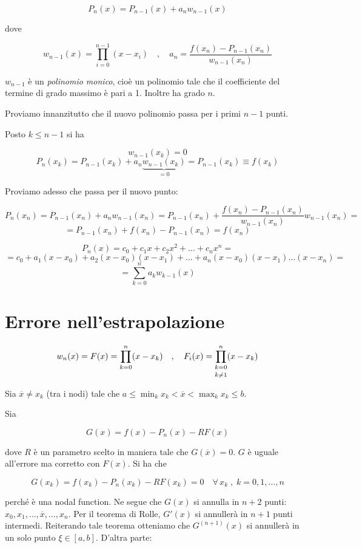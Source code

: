 $$P_n(x)=P_{n-1}(x) + a_n w_{n-1}(x)$$

dove

$$w_{n-1}(x)=\prod_{i=0}^{n-1} (x - x_i)
\quad,\quad
a_n=\frac{f(x_n) - P_{n-1}(x_n)}{w_{n-1}(x_n)}$$

$w_{n-1}$ è un \textit{polinomio monico}, cioè un polinomio tale che il coefficiente del termine di grado massimo è pari a 1. Inoltre ha grado $n$.

\vspace{0.2cm}Proviamo innanzitutto che il nuovo polinomio passa per i primi $n-1$ punti.

Posto $k \leq n-1$ si ha

$$w_{n-1}(x_k)=0$$
$$P_n(x_k)=P_{n-1}(x_k) + a_n \underbrace{w_{n-1}(x_k)}_{=0}
=P_{n-1}(x_k)
\equiv f(x_k)$$

Proviamo adesso che passa per il nuovo punto:

$$P_n(x_n)=P_{n-1}(x_n) + a_n w_{n-1}(x_n)
=P_{n-1}(x_n) + \frac{f(x_n) - P_{n-1}(x_n)}{w_{n-1}(x_n)} w_{n-1}(x_n)=$$
$$=P_{n-1}(x_n) + f(x_n) - P_{n-1}(x_n)
=f(x_n) $$

$$P_n(x)=c_0 + c_1x + c_2x^2 + \ldots + c_nx^n=$$
$$=c_0 + a_1(x-x_0) + a_2(x-x_0)(x-x_1) + \ldots + a_n(x-x_0)(x-x_1)\ldots(x-x_n)=$$
$$=\sum_{k=0}^{n} a_k w_{k-1}(x)$$

\section{Errore nell'estrapolazione}

$$w_n(x)=F(x)=\prod_{k=0}^{n} (x - x_k)
\quad,\quad
F_i(x)=\prod_{
   \begin{subarray}{c}
      k=0\\[0.1cm]
      k \neq 1
   \end{subarray}
}^{n} (x - x_k)$$

Sia $\overline{x} \neq x_k$ (tra i nodi) tale che $\displaystyle a \leq \min_{k} x_k < \overline{x} < \max_{k} x_k \leq b$.

Sia

$$G(x)=f(x) - P_n(x) - RF(x)$$

dove $R$ è un parametro scelto in maniera tale che $G(\overline{x})=0$. $G$ è uguale all'errore ma corretto con $F(x)$. Si ha che

$$G(x_k)=f(x_k) - P_n(x_k) - RF(x_k)=0
\quad \forall \, x_k \;,\; k=0,1,\ldots,n$$

perché è una nodal function. Ne segue che $G(x)$ si annulla in $n+2$ punti: $x_0,x_1,\ldots,\overline{x},\ldots,x_n$. Per il teorema di Rolle, $G'(x)$ si annullerà in $n+1$ punti intermedi. Reiterando tale teorema otteniamo che $G^{(n+1)}(x)$ si annullerà in un solo punto $\xi \in [a,b]$. D'altra parte:

